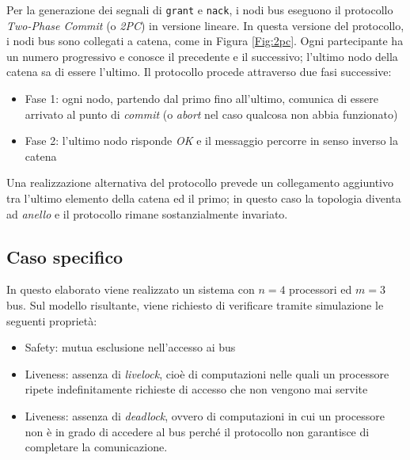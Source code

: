 Per la generazione dei segnali di \texttt{grant} e \texttt{nack}, i nodi bus eseguono il protocollo \textit{Two-Phase Commit} (o \textsl{2PC}) in versione lineare. In questa versione del protocollo, i nodi bus sono collegati a catena, come in Figura \ref{Fig:2pc}. Ogni partecipante ha un numero progressivo e conosce il precedente e il successivo; l'ultimo nodo della catena sa di essere l'ultimo. Il protocollo procede attraverso due fasi successive:
\begin{itemize}
\item Fase 1: ogni nodo, partendo dal primo fino all'ultimo, comunica di essere arrivato al punto di \textit{commit} (o \textit{abort} nel caso qualcosa non abbia funzionato)
\item Fase 2: l'ultimo nodo risponde \textit{OK} e il messaggio percorre in senso inverso la catena
\end{itemize}

Una realizzazione alternativa del protocollo prevede un collegamento aggiuntivo tra l'ultimo elemento della catena ed il primo; in questo caso la topologia diventa ad \textit{anello} e il protocollo rimane sostanzialmente invariato.

\subsection{Caso specifico}
\label{Sec:prop}
In questo elaborato viene realizzato un sistema con $n=4$ processori ed $m=3$ bus. Sul modello risultante, viene richiesto di verificare tramite simulazione le seguenti proprietà:
\begin{itemize}
\item Safety: mutua esclusione nell'accesso ai bus
\item Liveness: assenza di \textit{livelock}, cioè di computazioni nelle quali un processore ripete indefinitamente richieste di accesso che non vengono mai servite
\item Liveness: assenza di \textit{deadlock}, ovvero di computazioni in cui un processore non è in grado di accedere al bus perché il protocollo non garantisce di completare la comunicazione.
\end{itemize}
